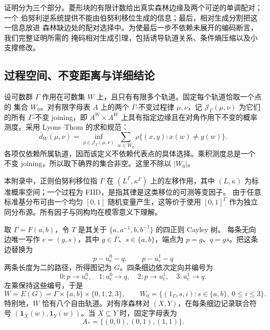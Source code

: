 \documentclass[UTF8,zihao=-4,a4paper]{ctexart}
\numberwithin{equation}{section}
\begin{document}
证明分为三个部分。菱形块的有限计数给出真实森林边缘及两个可逆的单调配对；一个
伯努利逆系统提供不能由伯努利移位生成的信息；最后，相对生成分割把这一信息放进
森林缺边处的配对选择中。为使最后一步不依赖未展开的编码断言，我们完整证明所需的
掩码相对生成引理，包括诱导轨道关系、条件熵压缩以及小支撑修改。

\subsection{过程空间、不变距离与详细结论}\label{b2:statement}

设可数群 $\Gamma$ 作用在可数集 $W$ 上，且只有有限多个轨道。固定每个轨道恰取一个点的
集合 $W_0$。对有限字母表 $A$ 上的两个 $\Gamma$-不变过程律 $\mu,\nu$，记
$\mathcal J_\Gamma(\mu,\nu)$ 为它们的所有 $\Gamma$-不变 joining，即
$A^W\times A^W$ 上具有指定边缘且在对角作用下不变的概率测度。采用
Lyons--Thom 的求和规范\cite[\S7]{LT}：
\begin{equation}\label{b2:barddef}
 \bar d_W(\mu,\nu)
 =\inf_{\rho\in\mathcal J_\Gamma(\mu,\nu)}
       \sum_{w\in W_0}\rho\{(x,y):x(w)\ne y(w)\}.
\end{equation}
各项仅依赖所属轨道，因而该定义不依赖代表点的具体选择。乘积测度总是一个
不变 joining，所以取下确界的集合非空。这里不除以 $|W_0|$。

本附录中，正则伯努利移位指 $\Gamma$ 在 $(L^\Gamma,\kappa^\Gamma)$ 上的左移作用，其中
$(L,\kappa)$ 为标准概率空间；一个过程为 FIID，是指其律是这类移位的可测等变因子。
由于任意标准基分布可由一个均匀 $[0,1]$ 随机变量产生，这等价于使用
$[0,1]^\Gamma$ 作为独立同分布源。所有因子与同构均在模零意义下理解。

取 $\Gamma=F(a,b)$，令 $T$ 是其关于 $\{a,a^{-1},b,b^{-1}\}$ 的四正则 Cayley 树。
每条无向边唯一写作 $e=(g,s)$，其中 $g\in\Gamma$、$s\in\{a,b\}$，端点为
$p=g$、$q=gs$。把这条边替换为
\[
 p-u_e^0-q,\qquad p-u_e^1-q
\]
两条长度为二的路径，所得图记为 $G$。四条细边依次定向并编号为
\begin{equation}\label{b2:edges}
 0:p\longrightarrow u_e^0,\quad 1:u_e^0\longrightarrow q,
 \quad 2:p\longrightarrow u_e^1,\quad 3:u_e^1\longrightarrow q.
\end{equation}
左乘保持这些编号，于是
\begin{equation}\label{b2:orbits}
 W=E(G)=\Gamma\times\{a,b\}\times\{0,1,2,3\},\qquad
 W_0=\{(1_\Gamma,s,i):s\in\{a,b\},\ 0\le i\le3\}.
\end{equation}
特别地，$W$ 恰有八个自由轨道。对有序森林对 $(X,Y)$，在每条细边记录联合符号
$(\mathbf1_X(w),\mathbf1_Y(w))$。当 $X\subseteq Y$ 时，固定字母表为
\begin{equation}\label{b2:alphabet}
 A_* = \{(0,0),(0,1),(1,1)\}.
\end{equation}
\end{document}
